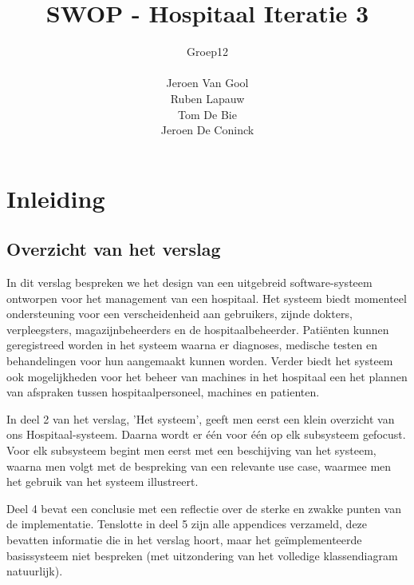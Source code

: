 \documentclass[a4paper]{article}
\title{SWOP - Hospitaal Iteratie 3}
\author{Groep12\\ \\Jeroen Van Gool\\Ruben Lapauw\\Tom De Bie\\Jeroen De Coninck}
\date{}
\begin{document}
\maketitle
\newpage
\tableofcontents
\newpage

\section{Inleiding}
\subsection{Overzicht van het verslag}
In dit verslag bespreken we het design van een uitgebreid software-systeem ontworpen voor het management van een hospitaal. Het systeem biedt momenteel ondersteuning voor een verscheidenheid aan gebruikers, zijnde dokters, verpleegsters, magazijnbeheerders en de hospitaalbeheerder. Pati\"enten kunnen geregistreed worden in het systeem waarna er diagnoses, medische testen en behandelingen voor hun aangemaakt kunnen worden. Verder biedt het systeem ook mogelijkheden voor het beheer van machines in het hospitaal een het plannen van afspraken tussen hospitaalpersoneel, machines en patienten.

In deel 2 van het verslag, 'Het systeem', geeft men eerst een klein overzicht van ons Hospitaal-systeem. Daarna wordt er \'e\'en voor \'e\'en op elk subsysteem gefocust.
Voor elk subsysteem begint men eerst met een beschijving van het systeem, waarna men volgt met de bespreking van een relevante use case, waarmee men het gebruik van het systeem illustreert.

Deel 4 bevat een conclusie met een reflectie over de sterke en zwakke punten van de implementatie. Tenslotte in deel 5 zijn alle appendices verzameld, deze bevatten informatie die in het verslag hoort, maar het ge\"implementeerde basissysteem niet bespreken (met uitzondering van het volledige klassendiagram natuurlijk).
\end{document}
